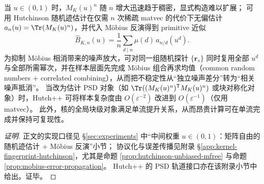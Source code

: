 \begin{conclusion}\label{con:xi-terminal-intermediate-u-mobius-hutchinson}
当 \(u\in(0,1)\) 时，\(M_K(u)^n\) 随 \(n\) 增大迅速趋于稠密，显式构造难以扩展；
可用 Hutchinson 随机迹估计在仅需 \(n\) 次稀疏 matvec 的代价下无偏估计
\(
a_n(u)=\Tr(M_K(u)^n)
\)，并代入 Möbius 反演得到 primitive 近似
\[
\widehat B_{K,n}(u)=\frac1n\sum_{d\mid n}\mu(d)\,\widehat a_{n/d}(u^d).
\]
为抑制 Möbius 相消带来的噪声放大，可对同一组随机探针 \(\{\mathbf r_s\}\) 同时复用全部 \(u^d\) 与全部所需幂次，并在样本层面先完成 Möbius 组合再求均值（common random numbers + correlated combining），从而把不稳定性从“独立噪声差分”转为“相关噪声抵消”。
当改为估计 PSD 对象（如 \(\Tr((M_K(u)^n)^{\mathsf T}M_K(u)^n)\) 或块对称化对象）时，Hutch++ 可将样本复杂度由 \(O(\varepsilon^{-2})\) 改进到 \(O(\varepsilon^{-1})\)（仅用 matvec）。
此外，核的全局块级对象满足单流提升关系，从而昂贵计算可在单流完成并保持可复现性。
\end{conclusion}
\begin{proof}[证明]
正文的实现口径见 \S\ref{sec:experiments} 中“中间权重 \(u\in(0,1)\)：矩阵自由的随机迹估计 + Möbius 反演”小节；
协议化与误差传播见附录 \S\ref{app:kernel-fingerprint-hutchinson}，尤其是命题 \ref{prop:hutchinson-unbiased-mfree} 与命题 \ref{prop:mobius-error-propagation}。
Hutch++ 的 PSD 轨道接口亦在该附录小节中给出。证毕。
\end{proof}
